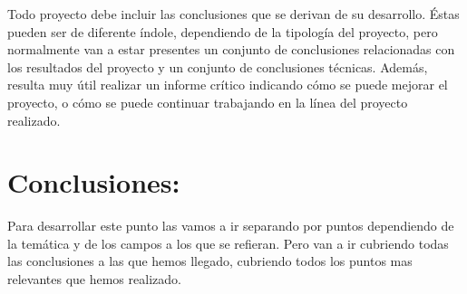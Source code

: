 
Todo proyecto debe incluir las conclusiones que se derivan de su desarrollo. Éstas pueden ser de diferente índole, dependiendo de la tipología del proyecto, pero normalmente van a estar presentes un conjunto de conclusiones relacionadas con los resultados del proyecto y un conjunto de conclusiones técnicas. 
Además, resulta muy útil realizar un informe crítico indicando cómo se puede mejorar el proyecto, o cómo se puede continuar trabajando en la línea del proyecto realizado. 



\section{Conclusiones:}
Para desarrollar este punto las vamos a ir separando por puntos dependiendo de la temática y de los campos a los que se refieran.
Pero van a ir cubriendo todas las conclusiones a las que hemos llegado, cubriendo todos los puntos mas relevantes que hemos realizado.

